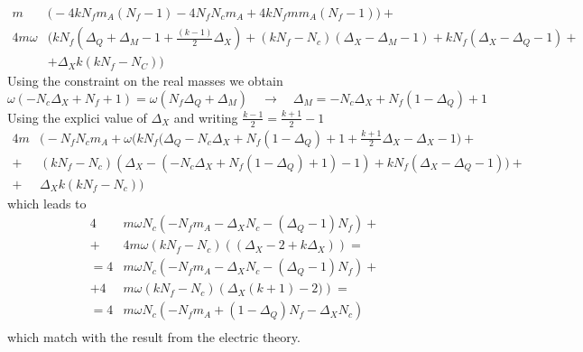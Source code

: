 \begin{appendices}
\begin{equation}
\begin{aligned}
 m  &\bigg( - 4 k N_f m_A ( N_f -1) - 4 N_f N_c m_A   + 4 k N_f m m_A (N_f -1)\bigg)  + \\
  4 m \omega &  \bigg(   k N_f( \Delta_Q + \Delta_M -1 + \frac{(k-1)}{2} \Delta_X )  + (k N_f -N_c) ( \Delta_X - \Delta_M - 1) + k N_f ( \Delta_X - \Delta_Q -1) + \\
  & +  \Delta_X  k ( k N_f - N_C) \bigg)
\end{aligned}
\end{equation}
Using the constraint on the real masses we obtain
\begin{equation}
	\omega ( - N_c \Delta_X + N_f + 1  ) = \omega ( N_f \Delta_Q + \Delta_M) \quad \rightarrow \quad 	\Delta_M = -N_c \Delta_X + N_f ( 1 - \Delta_Q) + 1
\end{equation}
Using the explici value of $\Delta_X$ and writing $\frac{k-1}{2} = \frac{k+1}{2} - 1$
\begin{equation}
\begin{aligned}
  4m & \bigg( -   N_f N_c m_A  +   \omega \big( k N_f ( \Delta_Q - N_c \Delta_X + N_f ( 1 - \Delta_Q)+ 1 + \frac{k+1}{2}\Delta_X - \Delta_X  -1 \big)  + \\
+& (k N_f -N_c) ( \Delta_X -( - N_c \Delta_X + N_f( 1-\Delta_Q) +1) - 1) +  k N_f (  \Delta_X -\Delta_Q - 1) \big)+ \\
+ &  \Delta_X  k ( k N_f - N_c)  \bigg)
\end{aligned}
\end{equation}
which leads to 
\begin{equation}
\begin{aligned}
 4 & m \omega N_c \left(   -   N_f  m_A
 -\Delta_{X} N_{c} - {\left(\Delta_{Q} - 1\right)} N_{f} \right) + \\
 + & 4 m \omega (k N_f - N_c) \left(
(\Delta_X - 2 + k \Delta_X )   \right)  = \\
= 4 & m \omega N_c \left(    -   N_f  m_A
 -\Delta_{X} N_{c} - {\left(\Delta_{Q} - 1\right)} N_{f} \right) + \\
 + 4 & m \omega ( k N_f - N_c) \left( \Delta_X ( k+1) -2 ) \right) = \\
 = 4 & m \omega N_c \left(    -   N_f  m_A + {\left(1-\Delta_{Q} \right)} N_{f}
 -\Delta_{X} N_{c}  \right)  \\
\end{aligned}
\end{equation}
which match with the result from the electric theory.



\end{appendices}

